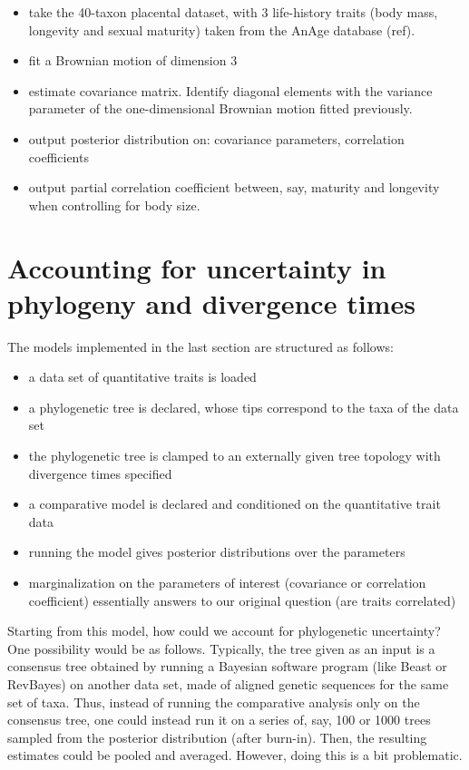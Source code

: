 \documentclass[usletter]{article}
\begin{document}
\begin{itemize}
\item
take the 40-taxon placental dataset, with 3 life-history traits (body mass, longevity and sexual maturity) taken from the AnAge database (ref).
\item
fit a Brownian motion of dimension 3
\item
estimate covariance matrix. Identify diagonal elements with the variance parameter of the one-dimensional Brownian motion fitted previously.
\item
output posterior distribution on: covariance parameters, correlation coefficients
\item
output partial correlation coefficient between, say, maturity and longevity when controlling for body size.
\end{itemize}

\section*{Accounting for uncertainty in phylogeny and divergence times}

The models implemented in the last section are structured as follows:
\begin{itemize}
\item
a data set of quantitative traits is loaded
\item
a phylogenetic tree is declared, whose tips correspond to the taxa of the data set
\item
the phylogenetic tree is clamped to an externally given tree topology with divergence times specified
\item
a comparative model is declared and conditioned on the quantitative trait data
\item
running the model gives posterior distributions over the parameters
\item
marginalization on the parameters of interest (covariance or correlation coefficient) essentially answers to our original question (are traits correlated)
\end{itemize}

Starting from this model, how could we account for phylogenetic uncertainty?
One possibility would be as follows.
Typically, the tree given as an input is a consensus tree obtained by running a Bayesian software program (like Beast or RevBayes) on another data set, made of aligned genetic sequences for the same set of taxa.
Thus, instead of running the comparative analysis only on the consensus tree, one could instead run it on a series of, say, 100 or 1000 trees sampled from the posterior distribution (after burn-in). Then, the resulting estimates could be pooled and averaged. However, doing this is a bit problematic.
\end{document}
